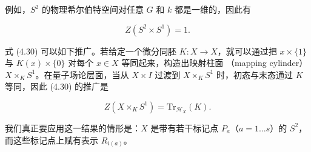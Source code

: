 \documentclass[11pt,a4paper]{article}
\begin{document}
例如，$S^2$ 的物理希尔伯特空间对任意 $G$ 和 $k$ 都是一维的，因此有

\begin{equation}
    Z(S^2\times S^1) = 1 . \tag{4.31}
\end{equation}

式 (4.30) 可以如下推广。若给定一个微分同胚 $K:X\to X$，就可以通过把
$x\times\{1\}$ 与 $K(x)\times\{0\}$ 对每个 $x\in X$ 等同起来，构造出映射柱面
（mapping cylinder）$X\times_K S^1$。在量子场论层面，当从 $X\times I$ 过渡到
$X\times_K S^1$ 时，初态与末态通过 $K$ 等同，因此 (4.30) 的推广是

\begin{equation}
    Z(X\times_K S^1) = \mathrm{Tr}_{\mathcal{H}_X}(K) . \tag{4.32}
\end{equation}

我们真正要应用这一结果的情形是：$X$ 是带有若干标记点 $P_a$（$a=1\dots s$）的 $S^2$，
而这些标记点上赋有表示 $R_{i(a)}$。


\end{document}
